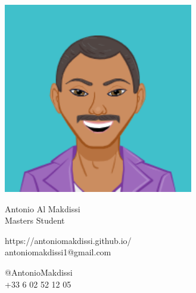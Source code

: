 \documentclass{article}
\begin{document}
\centering \includegraphics[width=.25\linewidth]{logo}\\[5pt]
\parbox{2in}{\Large \centering Antonio Al Makdissi\\[1pt]
\normalsize Masters Student}

\vfill
\raggedright
\begin{multicols}{2}
https://antoniomakdissi.github.io/\\
antoniomakdissi1@gmail.com

\columnbreak
\raggedleft
@AntonioMakdissi\\
+33 6 02 52 12 05%
\end{multicols}%
\end{document}
